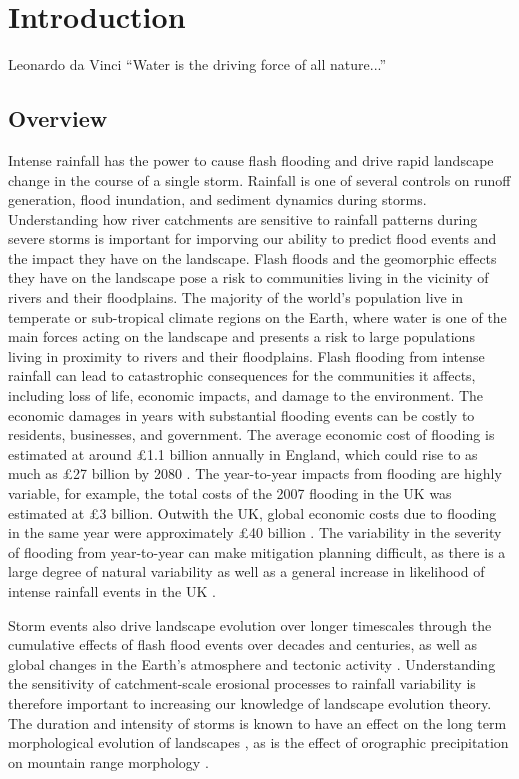 \chapter{Introduction}
\label{chapter_intro}

\begin{chapquote}{Leonardo da Vinci \textit{}}
``Water is the driving force of all nature...''
\end{chapquote}

\section{Overview}

Intense rainfall has the power to cause flash flooding and drive rapid landscape change in the course of a single storm. Rainfall is one of several controls on runoff generation, flood inundation, and sediment dynamics during storms. Understanding how river catchments are sensitive to rainfall patterns during severe storms is important for imporving our ability to predict flood events and the impact they have on the landscape.  Flash floods and the geomorphic effects they have on the landscape pose a risk to communities living in the vicinity of rivers and their floodplains. The majority of the world's population live in temperate or sub-tropical climate regions on the Earth, where water is one of the main forces acting on the landscape and presents a risk to large populations living in proximity to rivers and their floodplains. Flash flooding from intense rainfall can lead to catastrophic consequences for the communities it affects, including loss of life, economic impacts, and damage to the environment. The economic damages in years with substantial flooding events can be costly to residents, businesses, and government. The average economic cost of flooding is estimated at around £1.1 billion annually in England, which could rise to as much as £27 billion by 2080 \citep{bennett2014flood}. The year-to-year impacts from flooding are highly variable, for example, the total costs of the 2007 flooding in the UK was estimated at £3 billion. Outwith the UK, global economic costs due to flooding in the same year were approximately £40 billion \citep{pitt2008pitt}. The variability in the severity of flooding from year-to-year can make mitigation planning difficult, as there is a large degree of natural variability as well as a general increase in likelihood of intense rainfall events in the UK \citep{Kendon2014}. 

Storm events also drive landscape evolution over longer timescales through the cumulative effects of flash flood events over decades and centuries, as well as global changes in the Earth's atmosphere and tectonic activity \citep{Molnar1990,Molnar2001,whipple2006orogen}. Understanding the sensitivity of catchment-scale erosional processes to rainfall variability is therefore important to increasing our knowledge of landscape evolution theory. The duration and intensity of storms is known to have an effect on the long term morphological evolution of landscapes \citep{Solyom2004,solyom2007importance}, as is the effect of orographic precipitation on mountain range morphology \citep{han2015measuring}.

